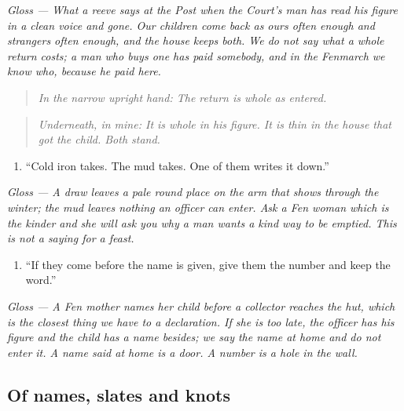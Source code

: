 \documentclass{design/chronicle}
\begin{document}
\emph{Gloss — What a reeve says at the Post when the Court’s man has read his figure in a clean voice and gone. Our children come back as ours often enough and strangers often enough, and the house keeps both. We do not say what a whole return costs; a man who buys one has paid somebody, and in the Fenmarch we know who, because he paid here.}

\begin{quote}\itshape \emph{In the narrow upright hand:} The return is whole as entered.\end{quote}

\begin{quote}\itshape *\end{quote}

\begin{quote}\itshape \emph{Underneath, in mine:} It is whole in his figure. It is thin in the house that got the child. Both stand.\end{quote}

\begin{enumerate}[leftmargin=1.4em,itemsep=1pt,topsep=3pt,parsep=0pt]

\item “Cold iron takes. The mud takes. One of them writes it down.”

\end{enumerate}

\emph{Gloss — A draw leaves a pale round place on the arm that shows through the winter; the mud leaves nothing an officer can enter. Ask a Fen woman which is the kinder and she will ask you why a man wants a kind way to be emptied. This is not a saying for a feast.}

\begin{enumerate}[leftmargin=1.4em,itemsep=1pt,topsep=3pt,parsep=0pt]

\item “If they come before the name is given, give them the number and keep the word.”

\end{enumerate}

\emph{Gloss — A Fen mother names her child before a collector reaches the hut, which is the closest thing we have to a declaration. If she is too late, the officer has his figure and the child has a name besides; we say the name at home and do not enter it. A name said at home is a door. A number is a hole in the wall.}

\subsection*{Of names, slates and knots}
\end{document}
